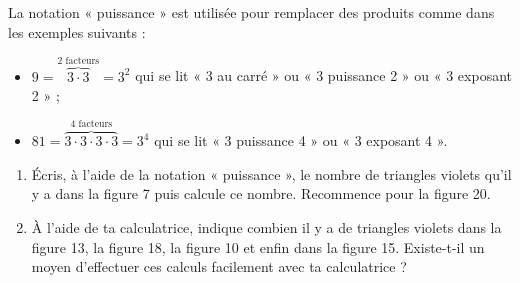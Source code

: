 \begin{activite}
\begin{partie}
La notation « puissance » est utilisée pour remplacer des produits comme dans les exemples suivants :
\begin{itemize}
 \item $9 = \stackrel{2 \text{ facteurs}}{\overbrace{3 \cdot 3}} = 3^2$ qui se lit « 3 au carré » ou « 3 puissance 2 » ou « 3 exposant 2 » ;
 \item $81 = \stackrel{4 \text{ facteurs}}{\overbrace{3 \cdot 3 \cdot 3 \cdot 3}} = 3^4$ qui se lit « 3 puissance 4 » ou « 3 exposant 4 ».
 \end{itemize}
\begin{enumerate}
 \item Écris, à l'aide de la notation « puissance », le nombre de triangles violets qu'il y a dans la figure 7 puis calcule ce nombre. Recommence pour la figure 20.
 \item À l'aide de ta calculatrice, indique combien il y a de triangles violets dans la figure 13, la figure 18, la figure 10 et enfin dans la figure 15. Existe-t-il un moyen d'effectuer ces calculs facilement avec ta calculatrice ?
 \end{enumerate}
\end{partie}

\end{activite}


